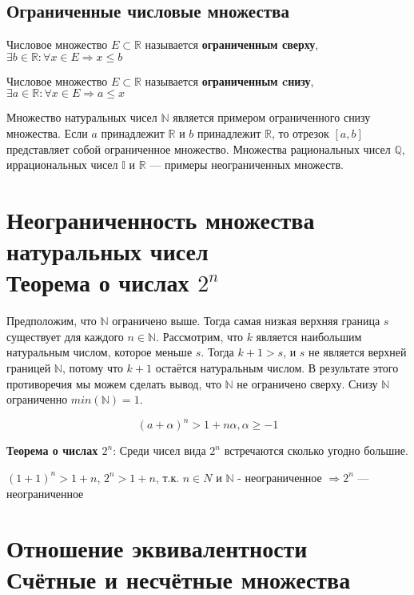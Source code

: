 \subsection{Ограниченные числовые множества}

Числовое множество $E \subset \mathbb{R}$ называется \textbf{ограниченным сверху}, $\exists b \in \mathbb{R} : \forall x \in E \Rightarrow x \leqslant b$

Числовое множество $E \subset \mathbb{R}$ называется \textbf{ограниченным cнизу}, $\exists a \in \mathbb{R} : \forall x \in E \Rightarrow a \leqslant x$
\bigskip

Множество натуральных чисел $\mathbb{N}$ является примером ограниченного снизу множества. Если $a$ принадлежит $\mathbb{R}$ и $b$ принадлежит $\mathbb{R}$, то отрезок $[a, b]$ представляет собой ограниченное множество. Множества рациональных чисел $\mathbb{Q}$, иррациональных чисел $\mathbb{I}$ и $\mathbb{R}$ — примеры неограниченных множеств.

\section{Неограниченность множества натуральных чисел \\ {\normalfont Теорема о числах $2^n$}}

Предположим, что $\mathbb{N}$ ограничено выше. Тогда самая низкая верхняя граница $s$ существует для каждого $n \in \mathbb{N}$. Рассмотрим, что $k$ является наибольшим натуральным числом, которое меньше $s$. Тогда $k + 1 > s$, и $s$ не является верхней границей $\mathbb{N}$, потому что $k + 1$ остаётся натуральным числом. В результате этого противоречия мы можем сделать вывод, что $\mathbb{N}$ не ограничено сверху.
Снизу $\mathbb{N}$ ограниченно $min(\mathbb{N}) = 1$.

$$(a + \alpha)^n > 1 + n\alpha, \alpha \geqslant -1$$

\textbf{Теорема о числах $2^n$}: Среди чисел вида $2^n$ встречаются сколько угодно большие.

\vspace{1.5em}
$(1 + 1)^n > 1 + n$, $2^n > 1 + n$, т.к. $n \in N$ и $\mathbb{N}$  - неограниченное $\Rightarrow 2^n$ — неограниченное
\newpage
\section{Отношение эквивалентности\\ {\normalfont Счётные и несчётные множества}}

